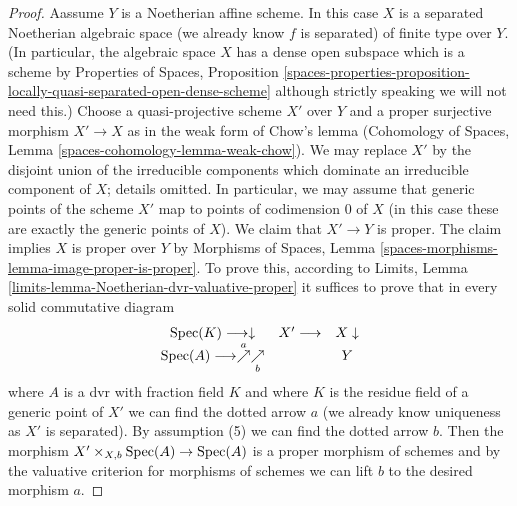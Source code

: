 \begin{proof}
\medskip\noindent
Aassume $Y$ is a Noetherian affine scheme. In this case $X$ is a
separated Noetherian algebraic space (we already know $f$ is separated)
of finite type over $Y$. (In particular, the algebraic space $X$
has a dense open subspace which is a scheme by Properties of Spaces, Proposition
\ref{spaces-properties-proposition-locally-quasi-separated-open-dense-scheme}
although strictly speaking we will not need this.)
Choose a quasi-projective scheme $X'$ over $Y$ and a proper surjective
morphism $X' \to X$ as in the weak form of Chow's lemma
(Cohomology of Spaces, Lemma \ref{spaces-cohomology-lemma-weak-chow}).
We may replace $X'$ by the disjoint union of the irreducible components
which dominate an irreducible component of $X$; details omitted.
In particular, we may assume that generic points of the scheme $X'$ map to
points of codimension $0$ of $X$ (in this case these are exactly
the generic points of $X$). We claim that $X' \to Y$ is proper.
The claim implies $X$ is proper over $Y$ by
Morphisms of Spaces, Lemma \ref{spaces-morphisms-lemma-image-proper-is-proper}.
To prove this, according to
Limits, Lemma \ref{limits-lemma-Noetherian-dvr-valuative-proper}
it suffices to prove that in every solid commutative diagram
$$
\begin{array}{ccc}\operatorname{Spec}(K) \longrightarrow\downarrow & X' \longrightarrow & X \downarrow \\ \operatorname{Spec}(A) \longrightarrow\overset{a}{\nearrow}\underset{b}{\nearrow} &  & Y\end{array}
$$
where $A$ is a dvr with fraction field $K$ and where $K$ is the residue
field of a generic point of $X'$ we can find the
dotted arrow $a$ (we already know uniqueness as $X'$ is separated).
By assumption (5) we can find the dotted arrow $b$.
Then the morphism $X' \times_{X, b} \operatorname{Spec}(A) \to \operatorname{Spec}(A)$
is a proper morphism of schemes and by the valuative criterion
for morphisms of schemes we can lift $b$ to the desired morphism $a$.
\end{proof}

